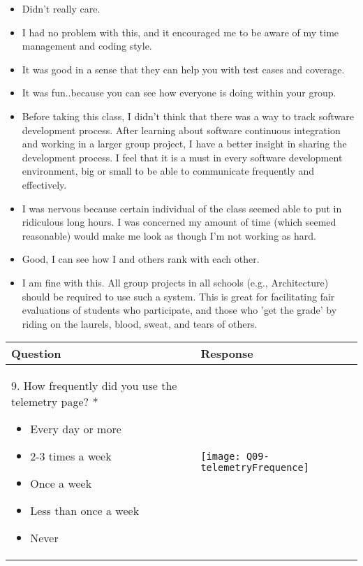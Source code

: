 \begin{itemize}
\item Didn't really care.
\item I had no problem with this, and it encouraged me to be aware of my time management and coding style.
\item It was good in a sense that they can help you with test cases and coverage.
\item It was fun..because you can see how everyone is doing within your group.
\item Before taking this class, I didn't think that there was a way to track software development process. After learning about software continuous integration and working in a larger group project, I have a better insight in sharing the development process. I feel that it is a must in every software development environment, big or small to be able to communicate frequently and effectively. 
\item I was nervous because certain individual of the class seemed able to put in ridiculous long hours.  I was concerned my amount of time (which seemed reasonable) would make me look as though I'm not working as hard. 
\item Good, I can see how I and others rank with each other.
\item I am fine with this.  All group projects in all schools (e.g., Architecture) should be required to use such a system.  This is great for facilitating fair evaluations of students who participate, and those who 'get the grade' by riding on the laurels, blood, sweat, and tears of others.
\end{itemize}

\begin{center}
\footnotesize
\begin{tabular}{|m{}|m{}|}
\hline 
{\bf Question}&{\bf Response}\\ \hline
9. How frequently did you use the telemetry page? *
\begin{itemize}
\item Every day or more
\item 2-3 times a week
\item Once a week
\item Less than once a week
\item Never
\end{itemize}
&
\label{Q9}
\texttt{[image: Q09-telemetryFrequence]} \\ \hline

\end{tabular}
\end{center}

